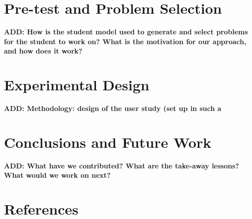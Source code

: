 \documentclass[twocolumn]{article}
\newcommand{\fix}[1]{{\bf #1}}
\begin{document}
\section{Pre-test and Problem Selection}
\label{sec:prob-selection}

\fix{ADD: How is the student model used to generate and select
  problems for the student to work on?  What is the motivation for our
  approach, and how does it work?}

\section{Experimental Design}
\label{sec:exper-design}

\fix{ADD:  Methodology:  design of the user study (set up in such a}

\section{Conclusions and Future Work}
\label{conclusions}

\fix{ADD:  What have we contributed?  What are the take-away lessons?
  What would we work on next?}
  
\section*{References}
\end{document}
